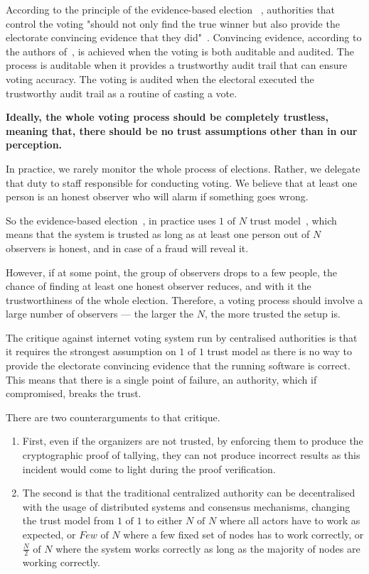 \documentclass[runningheads]{llncs}
\begin{document}
According to the principle of the evidence-based election ~\cite{starkEvidenceBasedElections2012}, authorities that control the voting "should not only find the true winner but also provide the electorate convincing evidence that they did"~\cite{appelEvidenceBasedElectionsCreate2019}. Convincing evidence, according to the authors of~\cite{starkEvidenceBasedElections2012}, is achieved when the voting is both auditable and audited. The process is auditable when it provides a trustworthy audit trail that can ensure voting accuracy. The voting is audited when the electoral executed the trustworthy audit trail as a routine of casting a vote.

\textbf{Ideally, the whole voting process should be completely trustless, meaning that, there should be no trust assumptions other than in our perception.}

In practice, we rarely monitor the whole process of elections. Rather, we delegate that duty to staff responsible for conducting voting. We believe that at least one person is an honest observer who will alarm if something goes wrong.

So the evidence-based election~\cite{appelEvidenceBasedElectionsCreate2019}, in practice uses $1 \textrm{ of } N$ trust model~\cite{buterinTrustModels2020}, which means that the system is trusted as long as at least one person out of $N$ observers is honest, and in case of a fraud will reveal it.

However, if at some point, the group of observers drops to a few people, the chance of finding at least one honest observer reduces, and with it the trustworthiness of the whole election. Therefore, a voting process should involve a large number of observers — the larger the $N$, the more trusted the setup is.

The critique against internet voting system run by centralised authorities is that it requires the strongest assumption on $1\textrm{ of }1$ trust model as there is no way to provide the electorate convincing evidence that the running software is correct. This means that there is a single point of failure, an authority, which if compromised, breaks the trust.

There are two counterarguments to that critique. 
\begin{enumerate}
    \item First, even if the organizers are not trusted, by enforcing them to produce the cryptographic proof of tallying, they can not produce incorrect results as this incident would come to light during the proof verification.
    \item  The second is that the traditional centralized authority can be decentralised with the usage of distributed systems and consensus mechanisms, changing the trust model from $1 \textrm{ of } 1$ to either $N \textrm{ of } N$ where all actors have to work as expected, or $Few \textrm{ of } N$ where a few fixed set of nodes has to work correctly, or $\frac{N}{2} \textrm{ of } N$ where the system works correctly as long as the majority of nodes are working correctly. 
\end{enumerate}
\end{document}
